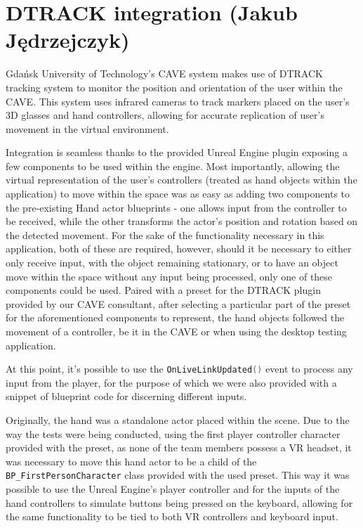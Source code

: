 \section{DTRACK integration (Jakub Jędrzejczyk)}
\label{chap:Dtrack}

Gdańsk University of Technology's CAVE system makes use of DTRACK \cite{DTRACK} tracking system to monitor the position and orientation of the user within the CAVE.
This system uses infrared cameras to track markers placed on the user's 3D glasses and hand controllers, allowing for accurate replication of user's movement in the virtual environment.

Integration is seamless thanks to the provided Unreal Engine plugin exposing a few components to be used within the engine.
Most importantly, allowing the virtual representation of the user's controllers (treated as hand objects within the application) to move within the space was as easy as adding two components to the pre-existing Hand actor blueprints - one allows input from the controller to be received, while the other transforms the actor's position and rotation based on the detected movement.
For the sake of the functionality necessary in this application, both of these are required, however, should it be necessary to either only receive input, with the object remaining stationary, or to have an object move within the space without any input being processed, only one of these components could be used.
Paired with a preset for the DTRACK plugin provided by our CAVE consultant, after selecting a particular part of the preset for the aforementioned components to represent, the hand objects followed the movement of a controller, be it in the CAVE or when using the desktop testing application.

At this point, it's possible to use the \lstinline[language=C]|OnLiveLinkUpdated()| event to process any input from the player, for the purpose of which we were also provided with a snippet of blueprint code for discerning different inputs.

Originally, the hand was a standalone actor placed within the scene. 
Due to the way the tests were being conducted, using the first player controller character provided with the preset, as none of the team members possess a VR headset, it was necessary to move this hand actor to be a child of the \lstinline[language=C]|BP_FirstPersonCharacter| class provided with the used preset.
This way it was possible to use the Unreal Engine's player controller and for the inputs of the hand controllers to simulate buttons being pressed on the keyboard, allowing for the same functionality to be tied to both VR controllers and keyboard input.